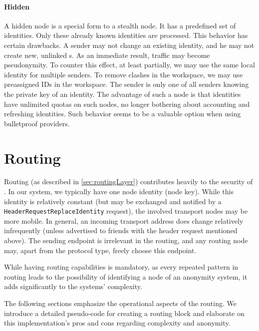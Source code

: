 \subsubsection{Hidden \VortexNode}\label{sec:hiddenNode}
A hidden node is a special form to a stealth node. It has a predefined set of identities. Only these already known identities are processed. This behavior has certain drawbacks. A sender may not change an existing identity, and he may not create new, unlinked  s. As an immediate result, traffic may become pseudonymity. To counter this effect, at least partially, we may use the same local identity for multiple senders. To remove clashes in the workspace, we may use preassigned IDs in the workspace. The sender is only one of all senders knowing the private key of an identity. The advantage of such a node is that identities have unlimited quotas on such nodes, no longer bothering about accounting and refreshing identities. Such behavior seems to be a valuable option when using bulletproof providers.

\chapter{Routing}
Routing (as described in \cref{sec:routingLayer}) contributes heavily to the security of \MessageVortex. In our system, we typically have one node identity (node key). While this identity is relatively constant (but may be exchanged and notified by a \texttt{HeaderRequestReplaceIdentity} request), the involved transport nodes may be more mobile. In general, an incoming transport address does change relatively infrequently (unless advertised to friends with the header request mentioned above). The sending endpoint is irrelevant in the routing, and any routing node may, apart from the protocol type, freely choose this endpoint. 

While having routing capabilities is mandatory, as every repeated pattern in routing leads to the possibility of identifying a node of an anonymity system, it adds significantly to the systems' complexity.

The following sections emphasize the operational aspects of the routing. We introduce a detailed pseudo-code for creating a routing block and elaborate on this implementation's pros and cons regarding complexity and anonymity.

